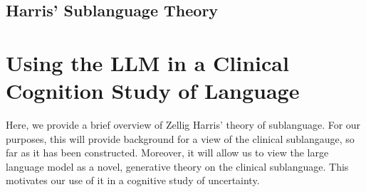 \subsection{Harris' Sublanguage Theory}


\section{Using the LLM in a Clinical Cognition Study of Language}
Here, we provide a brief overview of Zellig Harris' theory of sublanguage. For our purposes, this will provide background for a view of the clinical sublangauge, so far as it has been constructed. Moreover, it will allow us to view the large language model as a novel, generative theory on the clinical sublanguage. This motivates our use of it in a cognitive study of uncertainty. 





